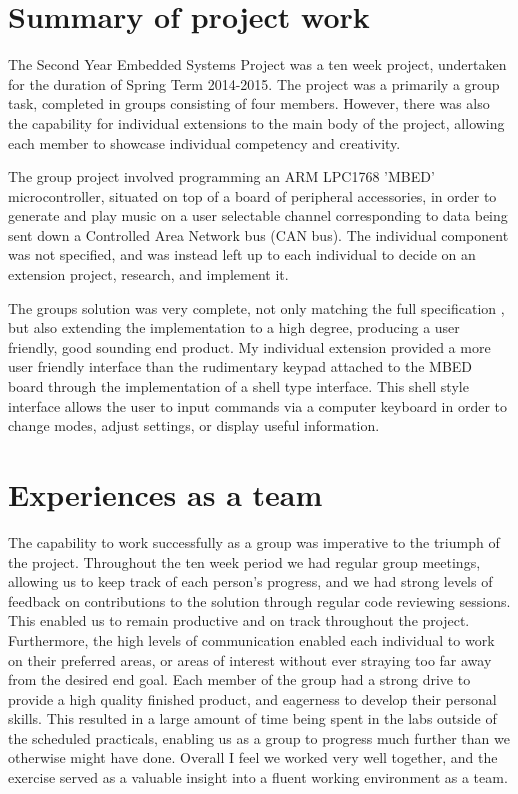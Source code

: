 \section{Summary of project work}
The Second Year Embedded Systems Project was a ten week project, undertaken 
for the duration of Spring Term 2014-2015. The project was a primarily a 
group task, completed in groups consisting of four members. However, there 
was also the capability for individual extensions to the main body of the 
project, allowing each member to showcase individual competency and creativity.

The group project involved programming an ARM LPC1768 'MBED' microcontroller, 
situated on top of a board of peripheral accessories, in order to 
generate and play music on a user selectable channel corresponding to data 
being sent down a Controlled Area Network bus (CAN bus). The individual 
component was not specified, and was instead left up to each individual to 
decide on an extension project, research, and implement it. 

The groups solution was very complete, not only matching the full specification
, but also extending the implementation to a high degree, producing a user 
friendly, good sounding end product. My individual extension provided a more 
user friendly interface than the 
rudimentary keypad attached to the MBED board through the implementation of a 
shell type interface. This shell style interface allows the user to input 
commands via a computer keyboard in order to change modes, adjust settings,
or display useful information.

 
\section{Experiences as a team}
The capability to work successfully as a group was imperative to the triumph of
the project. Throughout the ten week period we had regular group meetings, 
allowing us to keep track of each person's progress, and we had strong levels 
of feedback on contributions to the solution through regular code reviewing 
sessions. This enabled us to remain productive and on track throughout the 
project. 
Furthermore, the high levels of communication enabled each individual to work 
on their preferred areas, or areas of interest without ever straying too far 
away from the desired end goal. 
Each member of the group had a strong drive to 
provide a high quality finished product, and eagerness to develop their 
personal skills. This resulted in a large amount of time being spent in the 
labs outside of the scheduled practicals, enabling us as a group to progress 
much further than we otherwise might have done. Overall I feel we worked very 
well together, and the exercise served as a valuable insight into a fluent 
working environment as a team. 

